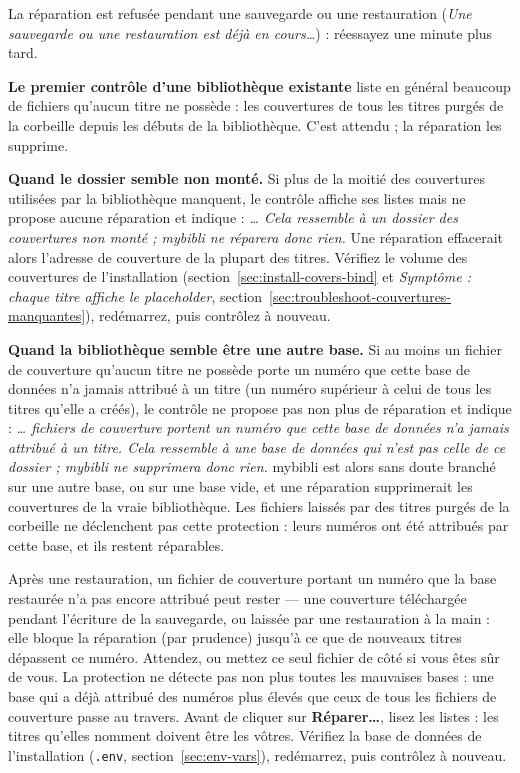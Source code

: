 La réparation est refusée pendant une sauvegarde ou une restauration
(\emph{Une sauvegarde ou une restauration est déjà en cours\dots}) :
réessayez une minute plus tard.

\textbf{Le premier contrôle d'une bibliothèque existante} liste en
général beaucoup de fichiers qu'aucun titre ne possède : les couvertures
de tous les titres purgés de la corbeille depuis les débuts de la
bibliothèque. C'est attendu ; la réparation les supprime.

\textbf{Quand le dossier semble non monté.} Si plus de la moitié des
couvertures utilisées par la bibliothèque manquent, le contrôle affiche
ses listes mais ne propose aucune réparation et indique : \emph{\dots{}
Cela ressemble à un dossier des couvertures non monté ; mybibli ne
réparera donc rien.} Une réparation effacerait alors l'adresse de
couverture de la plupart des titres. Vérifiez le volume des couvertures
de l'installation (section~\ref{sec:install-covers-bind} et
\emph{Symptôme : chaque titre affiche le placeholder},
section~\ref{sec:troubleshoot-couvertures-manquantes}), redémarrez, puis
contrôlez à nouveau.

\textbf{Quand la bibliothèque semble être une autre base.} Si au moins
un fichier de couverture qu'aucun titre ne possède porte un numéro que
cette base de données n'a jamais attribué à un titre (un numéro
supérieur à celui de tous les titres qu'elle a créés), le contrôle ne
propose pas non plus de réparation et indique : \emph{\dots{} fichiers
de couverture portent un numéro que cette base de données n'a jamais
attribué à un titre. Cela ressemble à une base de données qui n'est pas
celle de ce dossier ; mybibli ne supprimera donc rien.} mybibli est
alors sans doute branché sur une autre base, ou sur une base vide, et
une réparation supprimerait les couvertures de la vraie bibliothèque.
Les fichiers laissés par des titres purgés de la corbeille ne
déclenchent pas cette protection : leurs numéros ont été attribués par
cette base, et ils restent réparables.

Après une restauration, un fichier de couverture portant un numéro que
la base restaurée n'a pas encore attribué peut rester --- une couverture
téléchargée pendant l'écriture de la sauvegarde, ou laissée par une
restauration à la main : elle bloque la réparation (par prudence) jusqu'à
ce que de nouveaux titres dépassent ce numéro. Attendez, ou mettez ce
seul fichier de côté si vous êtes sûr de vous. La protection ne
détecte pas non plus toutes les mauvaises bases : une base qui a déjà
attribué des numéros plus élevés que ceux de tous les fichiers de
couverture passe au travers. Avant de cliquer sur \textbf{Réparer…},
lisez les listes : les titres qu'elles nomment doivent être les
vôtres. Vérifiez la base
de données de l'installation (\texttt{.env},
section~\ref{sec:env-vars}), redémarrez, puis contrôlez à nouveau.

